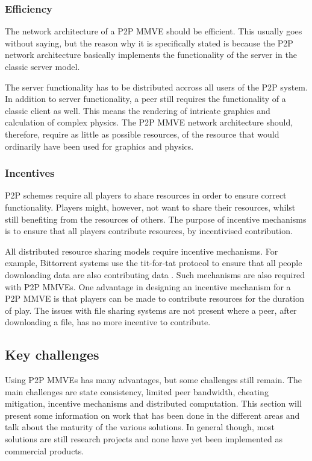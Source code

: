 \subsubsection{Efficiency}

The network architecture of a P2P MMVE should be efficient. This usually goes without saying, but the reason why it is specifically stated is because the P2P network architecture basically implements the functionality of the server in the classic server model.

The server functionality has to be distributed accross all users of the P2P system. In addition to server functionality, a peer still requires the functionality of a classic client as well. This means the rendering of intricate graphics and calculation of complex physics. The P2P MMVE network architecture should, therefore, require as little as possible resources, of the resource that would ordinarily have been used for graphics and physics.

\subsubsection{Incentives}

P2P schemes require all players to share resources in order to ensure correct functionality. Players might, however, not want to share their resources, whilst still benefiting from the resources of others. The purpose of incentive mechanisms is to ensure that all players contribute resources, by incentivised contribution.

All distributed resource sharing models require incentive mechanisms. For example, Bittorrent systems use the tit-for-tat protocol to ensure that all people downloading data are also contributing data \cite{tit_for_tat}. Such mechanisms are also required with P2P MMVEs. One advantage in designing an incentive mechanism for a P2P MMVE is that players can be made to contribute resources for the duration of play. The issues with file sharing systems are not present where a peer, after downloading a file, has no more incentive to contribute.

\subsection{Key challenges}
\label{key_challenges}

Using P2P MMVEs has many advantages, but some challenges still remain. The main challenges are state consistency, limited peer bandwidth, cheating mitigation, incentive mechanisms and distributed computation. This section will present some information on work that has been done in the different areas and talk about the maturity of the various solutions. In general though, most solutions are still research projects and none have yet been implemented as commercial products.

